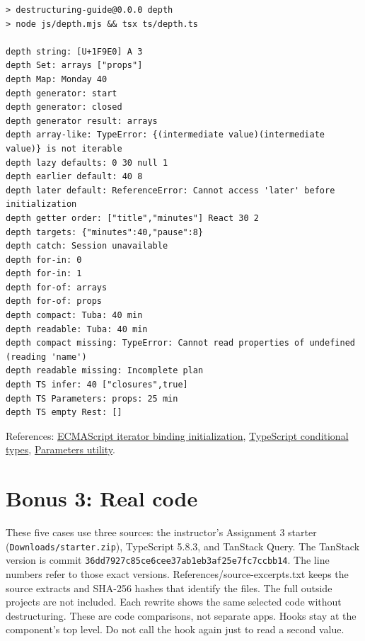 \documentclass[
  10pt,
  a4paper,
]{article}
\begin{document}
\begin{minipage}{\linewidth}

\begin{lstlisting}
> destructuring-guide@0.0.0 depth
> node js/depth.mjs && tsx ts/depth.ts

depth string: [U+1F9E0] A 3
depth Set: arrays ["props"]
depth Map: Monday 40
depth generator: start
depth generator: closed
depth generator result: arrays
depth array-like: TypeError: {(intermediate value)(intermediate value)} is not iterable
depth lazy defaults: 0 30 null 1
depth earlier default: 40 8
depth later default: ReferenceError: Cannot access 'later' before initialization
depth getter order: ["title","minutes"] React 30 2
depth targets: {"minutes":40,"pause":8}
depth catch: Session unavailable
depth for-in: 0
depth for-in: 1
depth for-of: arrays
depth for-of: props
depth compact: Tuba: 40 min
depth readable: Tuba: 40 min
depth compact missing: TypeError: Cannot read properties of undefined (reading 'name')
depth readable missing: Incomplete plan
depth TS infer: 40 ["closures",true]
depth TS Parameters: props: 25 min
depth TS empty Rest: []
\end{lstlisting}

\end{minipage}\par

References:
\href{https://tc39.es/ecma262/multipage/ecmascript-language-statements-and-declarations.html\#sec-destructuring-binding-patterns-runtime-semantics-iteratorbindinginitialization}{ECMAScript
iterator binding initialization},
\href{https://www.typescriptlang.org/docs/handbook/2/conditional-types.html}{TypeScript
conditional types},
\href{https://www.typescriptlang.org/docs/handbook/utility-types.html\#parameterstype}{Parameters
utility}.

\section{Bonus 3: Real code}\label{bonus-3-real-code}

These five cases use three sources: the instructor's Assignment 3
starter (\texttt{Downloads/\allowbreak{}starter.\allowbreak{}zip}),
TypeScript 5.8.3, and TanStack Query. The TanStack version is commit
\texttt{36dd7927c85ce6cee37ab1eb3af25e7fc7ccbb14}. The line numbers
refer to those exact versions. References/source-excerpts.txt keeps the
source extracts and SHA-256 hashes that identify the files. The full
outside projects are not included. Each rewrite shows the same selected
code without destructuring. These are code comparisons, not separate
apps. Hooks stay at the component's top level. Do not call the hook
again just to read a second value.
\end{document}
